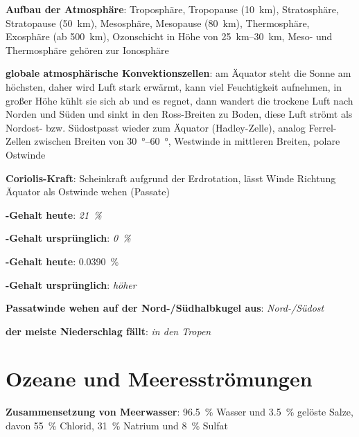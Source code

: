 \textbf{Aufbau der Atmosphäre}:
Troposphäre,
Tropopause (\SI{10}{\kilo\meter}),
Stratosphäre,\\
Stratopause (\SI{50}{\kilo\meter}),
Mesosphäre,
Mesopause (\SI{80}{\kilo\meter}),
Thermosphäre,
Exosphäre (ab \SI{500}{\kilo\meter}),
Ozonschicht in Höhe von \SIrange{25}{30}{\kilo\meter},
Meso- und Thermosphäre gehören zur Ionosphäre

\textbf{globale atmosphärische Konvektionszellen}:
am Äquator steht die Sonne am höchsten, daher wird Luft stark erwärmt,
kann viel Feuchtigkeit aufnehmen,
in großer Höhe kühlt sie sich ab und es regnet,
dann wandert die trockene Luft nach Norden und Süden und sinkt in den Ross-Breiten zu Boden,
diese Luft strömt als Nordost- bzw. Südostpasst wieder zum Äquator (Hadley-Zelle),
analog Ferrel-Zellen zwischen Breiten von \SIrange{30}{60}{\degree},
Westwinde in mittleren Breiten,
polare Ostwinde

\textbf{Coriolis-Kraft}:
Scheinkraft aufgrund der Erdrotation,
lässt Winde Richtung Äquator als Ostwinde wehen (Passate)

\begin{wichtig}
    \item
    \textbf{-Gehalt heute}:
    \emph{\SI[math-rm=\mathit,text-rm=\itshape]{21}{\percent}}

    \item
    \textbf{-Gehalt ursprünglich}:
    \emph{\SI[math-rm=\mathit,text-rm=\itshape]{0}{\percent}}

    \item
    \textbf{-Gehalt heute}:
    \SI[math-rm=\mathit,text-rm=\itshape]{0.0390}{\percent}

    \item
    \textbf{-Gehalt ursprünglich}:
    \emph{höher}

    \item
    \textbf{Passatwinde wehen auf der Nord-/Südhalbkugel aus}:
    \emph{Nord-/Südost}

    \item
    \textbf{der meiste Niederschlag fällt}:
    \emph{in den Tropen}
\end{wichtig}

\pagebreak

\section{%
    Ozeane und Meeresströmungen%
}

\textbf{Zusammensetzung von Meerwasser}:
\SI{96.5}{\percent} Wasser und
\SI{3.5}{\percent} gelöste Salze,
davon \SI{55}{\percent} Chlorid,
\SI{31}{\percent} Natrium und
\SI{8}{\percent} Sulfat

